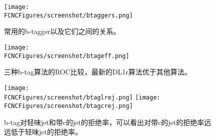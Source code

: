 \begin{figure}[H]
\centering
\texttt{[image: \\FCNCFigures/screenshot/btaggers.png]}
\caption{常用的b-tagger以及它们之间的关系。}
\label{fig:btaggers}
\end{figure}

\begin{figure}[H]
\centering
\texttt{[image: \\FCNCFigures/screenshot/btageff.png]}
\caption{三种b-tag算法的ROC比较，最新的DL1r算法优于其他算法。}
\label{fig:btageff}
\end{figure}

\begin{figure}[H]
\centering
\texttt{[image: \\FCNCFigures/screenshot/btaglrej.png]}
\texttt{[image: \\FCNCFigures/screenshot/btagcrej.png]}
\caption{b-tag对轻味jet和带c的jet的拒绝率，可以看出对带c的jet的拒绝率远远低于轻味jet的拒绝率。}
\label{fig:btagrej}
\end{figure}